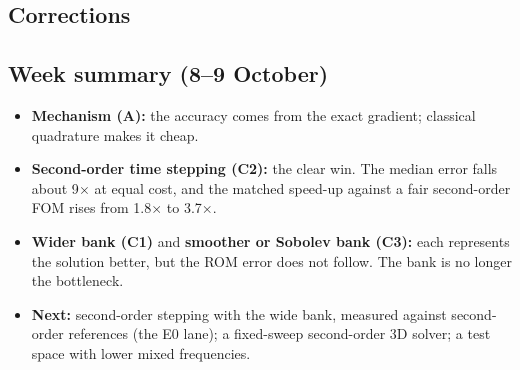 \subsection*{Corrections}

\subsection*{Week summary (8--9 October)}
\begin{itemize}
\item \textbf{Mechanism (A):} the accuracy comes from the exact gradient; classical quadrature makes it cheap.
\item \textbf{Second-order time stepping (C2):} the clear win. The median error falls about 9$\times$ at equal cost, and the matched speed-up against a fair second-order FOM rises from 1.8$\times$ to 3.7$\times$.
\item \textbf{Wider bank (C1)} and \textbf{smoother or Sobolev bank (C3):} each represents the solution better, but the ROM error does not follow. The bank is no longer the bottleneck.
\item \textbf{Next:} second-order stepping with the wide bank, measured against second-order references (the E0 lane); a fixed-sweep second-order 3D solver; a test space with lower mixed frequencies.
\end{itemize}
